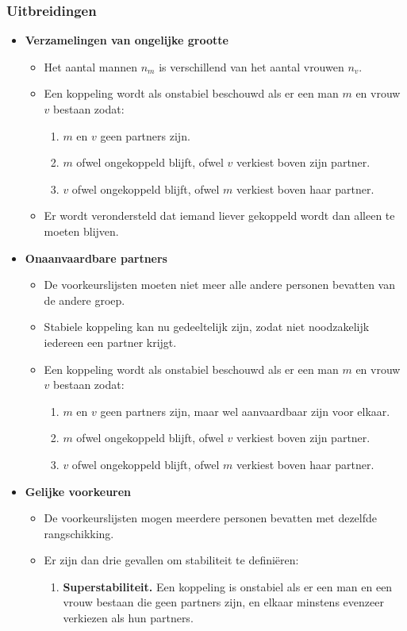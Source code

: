 \subsubsection{Uitbreidingen}
\begin{itemize}
    \item \textbf{Verzamelingen van ongelijke grootte} \begin{itemize}
        \item Het aantal mannen $n_m$ is verschillend van het aantal vrouwen $n_v$.
        \item Een koppeling wordt als onstabiel beschouwd als er een man $m$ en vrouw $v$ bestaan zodat:
        \begin{enumerate}
            \item $m$ en $v$ geen partners zijn.
            \item $m$ ofwel ongekoppeld blijft, ofwel $v$ verkiest boven zijn partner.
            \item $v$ ofwel ongekoppeld blijft, ofwel $m$ verkiest boven haar partner.
        \end{enumerate}
        \item Er wordt verondersteld dat iemand liever gekoppeld wordt dan alleen te moeten blijven.
    \end{itemize}
    \item \textbf{Onaanvaardbare partners} \begin{itemize}
        \item De voorkeurslijsten moeten niet meer alle andere personen bevatten van de andere groep.
        \item Stabiele koppeling kan nu gedeeltelijk zijn, zodat niet noodzakelijk iedereen een partner krijgt.
        \item Een koppeling wordt als onstabiel beschouwd als er een man $m$ en vrouw $v$ bestaan zodat:
        \begin{enumerate}
            \item $m$ en $v$ geen partners zijn, maar wel aanvaardbaar zijn voor elkaar.
            \item $m$ ofwel ongekoppeld blijft, ofwel $v$ verkiest boven zijn partner.
            \item $v$ ofwel ongekoppeld blijft, ofwel $m$ verkiest boven haar partner.
        \end{enumerate}
    \end{itemize}
    \item \textbf{Gelijke voorkeuren} \begin{itemize}
        \item De voorkeurslijsten mogen meerdere personen bevatten met dezelfde rangschikking.
        \item Er zijn dan drie gevallen om stabiliteit te definiëren:
        \begin{enumerate}
            \item \textbf{Superstabiliteit.} Een koppeling is onstabiel als er een man en een vrouw bestaan die geen partners zijn, en elkaar minstens evenzeer verkiezen als hun partners.


\end{enumerate}
\end{itemize}
\end{itemize}
